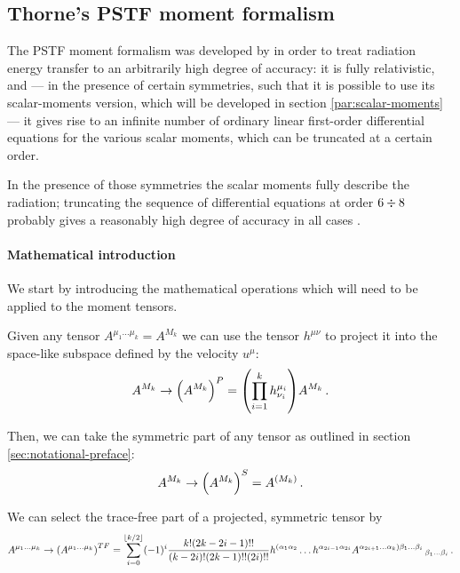 \documentclass[main.tex]{subfiles}
\begin{document}
\subsection{Thorne's PSTF moment formalism}

The PSTF moment formalism was developed by \textcite{Thorne:1981feb} in order to treat radiation energy transfer to an arbitrarily high degree of accuracy: it is fully relativistic, and --- in the presence of certain symmetries, such that it is possible to use its scalar-moments version, which will be developed in section \ref{par:scalar-moments} --- it gives rise to an infinite number of ordinary linear first-order differential equations for the various scalar moments, which can be truncated at a certain order.

In the presence of those symmetries the scalar moments fully describe the radiation; truncating the sequence of differential equations at order \(6 \divisionsymbol 8\) probably gives a reasonably high degree of accuracy in all cases \cite[p. 1285]{TurollaNobili:1988}.

\paragraph{Mathematical introduction}

We start by introducing the mathematical operations which will need to be applied to the moment tensors.

Given any tensor \(A^{\mu_1 \dots \mu_k} = A^{M_k}\) we can use the tensor \(h^{\mu\nu}\) to project it into the space-like subspace defined by the velocity \(u^\mu\):
\begin{equation}
    A^{M_k} \rightarrow \qty(A^{M_k})^P
    = \qty(\prod_{i=1}^k h^{\mu_i}_{\nu_i}) A^{M_k} \,.
\end{equation}

Then, we can take the symmetric part of any tensor as outlined in section \ref{sec:notational-preface}:
\begin{equation}
    A^{M_k} \rightarrow \qty(A^{M_k})^S
    = A^{(M_k)} \,.
\end{equation}

We can select the trace-free part of a projected, symmetric tensor by
\begin{equation}
    A^{\mu_1 \dots \mu_k} \rightarrow \qty(A^{\mu_1 \dots \mu_k})^{TF}
    = \sum _{i=0}   ^{\lfloor k/2 \rfloor}
    (-1)^i \frac{k! (2k-2i-1)!!}{(k-2i)! (2k-1)!! (2i)!!}
    h^{(\alpha_1 \alpha_2} \dots h^{\alpha_{2i-1} \alpha_{2i}}
    A^{\alpha_{2i+1} \dots \alpha_k) \beta_1 \dots \beta_i}\,_{\beta_1 \dots \beta_i} \,.
\end{equation}
\end{document}
